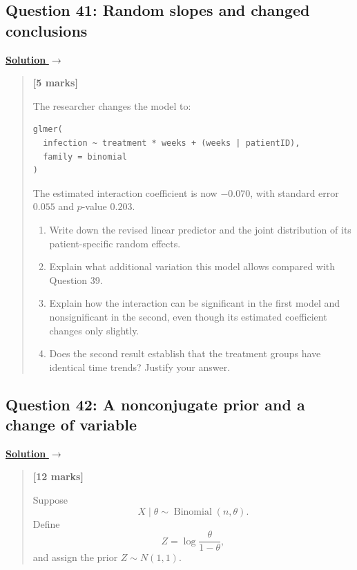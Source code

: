 \documentclass[11pt,a4paper]{article}
\newcommand{\given}{\mathrel{|}}
\newcommand{\E}{\mathbb{E}}
\newcommand{\partmarks}[1]{%
  \unskip\nobreak\hfill\penalty50\hskip1em\null\nobreak\hfill
  \mbox{\textbf{[#1]}}}
\newenvironment{examquestion}[2]
  {\subsection{#1}\label{question:\arabic{subsection}}\label{#2}%
   \noindent\hyperref[answer:\arabic{subsection}]{\textbf{Solution} $\rightarrow$}%
   \begin{quote}\color{statgrey}}
  {\end{quote}}
\begin{document}
\begin{examquestion}{Question 41: Random slopes and changed conclusions}{question:practice-random-slopes-and-changed-conclusions}
\textbf{[5 marks]}

The researcher changes the model to:
\begin{verbatim}
glmer(
  infection ~ treatment * weeks + (weeks | patientID),
  family = binomial
)
\end{verbatim}
The estimated interaction coefficient is now $-0.070$, with standard error
$0.055$ and $p$-value $0.203$.
\begin{enumerate}[label=(\alph*)]
  \item Write down the revised linear predictor and the joint
        distribution of its patient-specific random effects.
  \item Explain what additional variation this model allows compared
        with Question 39.
  \item Explain how the interaction can be significant in the first
        model and nonsignificant in the second, even though its estimated
        coefficient changes only slightly.
  \item Does the second result establish that the treatment groups have
        identical time trends? Justify your answer.
\end{enumerate}
\end{examquestion}

\clearpage

\begin{examquestion}{Question 42: A nonconjugate prior and a change of variable}{question:practice-a-nonconjugate-prior-and-a-change-of-variable}
\textbf{[12 marks]}

Suppose
\[
X\given\theta\sim\operatorname{Binomial}(n,\theta).
\]
Define
\[
Z=\log\frac{\theta}{1-\theta},
\]
and assign the prior $Z\sim N(1,1)$.

\end{examquestion}
\end{document}
